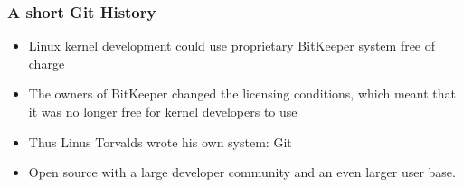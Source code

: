 \begin{frame}
\frametitle{A short Git History}
\begin{itemize}
    \item Linux kernel development could use proprietary BitKeeper system
        free of charge
    \item The owners of BitKeeper changed the licensing conditions, which
        meant that it was no longer free for kernel developers to use
    \item Thus Linus Torvalds wrote his own system: Git
    \item Open source with a large developer community and an even larger
        user base.
\end{itemize}
\end{frame}

